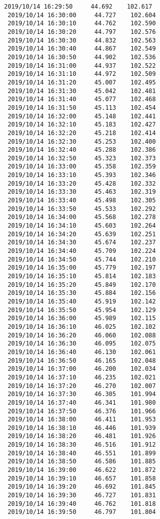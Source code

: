 \documentclass[11pt]{article}
\begin{document}
\begin{Verbatim}[commandchars=\\\{\}]
 2019/10/14 16:29:50     44.692    102.617
 2019/10/14 16:30:00     44.727    102.604
 2019/10/14 16:30:10     44.762    102.590
 2019/10/14 16:30:20     44.797    102.576
 2019/10/14 16:30:30     44.832    102.563
 2019/10/14 16:30:40     44.867    102.549
 2019/10/14 16:30:50     44.902    102.536
 2019/10/14 16:31:00     44.937    102.522
 2019/10/14 16:31:10     44.972    102.509
 2019/10/14 16:31:20     45.007    102.495
 2019/10/14 16:31:30     45.042    102.481
 2019/10/14 16:31:40     45.077    102.468
 2019/10/14 16:31:50     45.113    102.454
 2019/10/14 16:32:00     45.148    102.441
 2019/10/14 16:32:10     45.183    102.427
 2019/10/14 16:32:20     45.218    102.414
 2019/10/14 16:32:30     45.253    102.400
 2019/10/14 16:32:40     45.288    102.386
 2019/10/14 16:32:50     45.323    102.373
 2019/10/14 16:33:00     45.358    102.359
 2019/10/14 16:33:10     45.393    102.346
 2019/10/14 16:33:20     45.428    102.332
 2019/10/14 16:33:30     45.463    102.319
 2019/10/14 16:33:40     45.498    102.305
 2019/10/14 16:33:50     45.533    102.292
 2019/10/14 16:34:00     45.568    102.278
 2019/10/14 16:34:10     45.603    102.264
 2019/10/14 16:34:20     45.639    102.251
 2019/10/14 16:34:30     45.674    102.237
 2019/10/14 16:34:40     45.709    102.224
 2019/10/14 16:34:50     45.744    102.210
 2019/10/14 16:35:00     45.779    102.197
 2019/10/14 16:35:10     45.814    102.183
 2019/10/14 16:35:20     45.849    102.170
 2019/10/14 16:35:30     45.884    102.156
 2019/10/14 16:35:40     45.919    102.142
 2019/10/14 16:35:50     45.954    102.129
 2019/10/14 16:36:00     45.989    102.115
 2019/10/14 16:36:10     46.025    102.102
 2019/10/14 16:36:20     46.060    102.088
 2019/10/14 16:36:30     46.095    102.075
 2019/10/14 16:36:40     46.130    102.061
 2019/10/14 16:36:50     46.165    102.048
 2019/10/14 16:37:00     46.200    102.034
 2019/10/14 16:37:10     46.235    102.021
 2019/10/14 16:37:20     46.270    102.007
 2019/10/14 16:37:30     46.305    101.994
 2019/10/14 16:37:40     46.341    101.980
 2019/10/14 16:37:50     46.376    101.966
 2019/10/14 16:38:00     46.411    101.953
 2019/10/14 16:38:10     46.446    101.939
 2019/10/14 16:38:20     46.481    101.926
 2019/10/14 16:38:30     46.516    101.912
 2019/10/14 16:38:40     46.551    101.899
 2019/10/14 16:38:50     46.586    101.885
 2019/10/14 16:39:00     46.622    101.872
 2019/10/14 16:39:10     46.657    101.858
 2019/10/14 16:39:20     46.692    101.845
 2019/10/14 16:39:30     46.727    101.831
 2019/10/14 16:39:40     46.762    101.818
 2019/10/14 16:39:50     46.797    101.804

\end{Verbatim}
\end{document}
